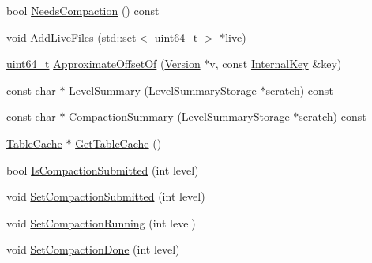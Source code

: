 \begin{DoxyCompactItemize}
\item 
bool \hyperlink{classleveldb_1_1_version_set_aa2976498024282e1449dcba88c6df162}{Needs\+Compaction} () const 
\item 
void \hyperlink{classleveldb_1_1_version_set_a3b3c810f0fea88db81b94e604b3dd78f}{Add\+Live\+Files} (std\+::set$<$ \hyperlink{stdint_8h_aaa5d1cd013383c889537491c3cfd9aad}{uint64\+\_\+t} $>$ $\ast$live)
\item 
\hyperlink{stdint_8h_aaa5d1cd013383c889537491c3cfd9aad}{uint64\+\_\+t} \hyperlink{classleveldb_1_1_version_set_ada7f3ed63b1c48adb6e5b38348b300e1}{Approximate\+Offset\+Of} (\hyperlink{classleveldb_1_1_version}{Version} $\ast$v, const \hyperlink{classleveldb_1_1_internal_key}{Internal\+Key} \&key)
\item 
const char $\ast$ \hyperlink{classleveldb_1_1_version_set_abc156e2c0a7f2d0ef4a14b6f27a382a3}{Level\+Summary} (\hyperlink{structleveldb_1_1_version_set_1_1_level_summary_storage}{Level\+Summary\+Storage} $\ast$scratch) const 
\item 
const char $\ast$ \hyperlink{classleveldb_1_1_version_set_aceb6120a5531740632396dd9fd8f5a72}{Compaction\+Summary} (\hyperlink{structleveldb_1_1_version_set_1_1_level_summary_storage}{Level\+Summary\+Storage} $\ast$scratch) const 
\item 
\hyperlink{classleveldb_1_1_table_cache}{Table\+Cache} $\ast$ \hyperlink{classleveldb_1_1_version_set_a242c2a2a2294551dae1dd1488d6d44f2}{Get\+Table\+Cache} ()
\item 
bool \hyperlink{classleveldb_1_1_version_set_a8645a78e2a7cd20c6a1a09ccfec30561}{Is\+Compaction\+Submitted} (int level)
\item 
void \hyperlink{classleveldb_1_1_version_set_aca8817a0ed3f119753031f4e9384b4cc}{Set\+Compaction\+Submitted} (int level)
\item 
void \hyperlink{classleveldb_1_1_version_set_aadb558085c1882042792e16c02f56927}{Set\+Compaction\+Running} (int level)
\item 
void \hyperlink{classleveldb_1_1_version_set_a74c307da0084c2d39e9e9a48479bfe39}{Set\+Compaction\+Done} (int level)
\end{DoxyCompactItemize}
